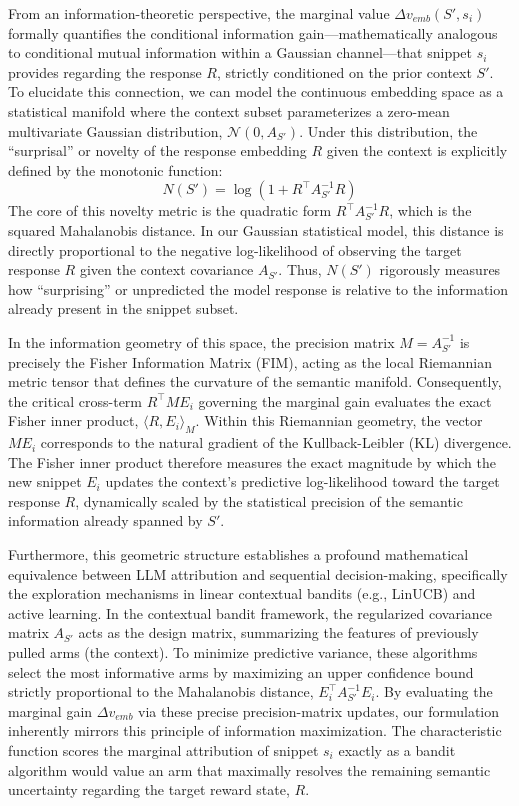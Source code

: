 \documentclass{article}
\begin{document}
From an information-theoretic perspective, the marginal value $\Delta v_{emb}(S', s_i)$ formally quantifies the conditional information gain—mathematically analogous to conditional mutual information within a Gaussian channel—that snippet $s_i$ provides regarding the response $R$, strictly conditioned on the prior context $S'$. To elucidate this connection, we can model the continuous embedding space as a statistical manifold where the context subset parameterizes a zero-mean multivariate Gaussian distribution, $\mathcal{N}(0, A_{S'})$. Under this distribution, the ``surprisal'' or novelty of the response embedding $R$ given the context is explicitly defined by the monotonic function:
$$ N(S') = \log(1 + R^\top A_{S'}^{-1} R) $$
The core of this novelty metric is the quadratic form $R^\top A_{S'}^{-1} R$, which is the squared Mahalanobis distance. In our Gaussian statistical model, this distance is directly proportional to the negative log-likelihood of observing the target response $R$ given the context covariance $A_{S'}$. Thus, $N(S')$ rigorously measures how ``surprising'' or unpredicted the model response is relative to the information already present in the snippet subset.

In the information geometry of this space, the precision matrix $M = A_{S'}^{-1}$ is precisely the Fisher Information Matrix (FIM), acting as the local Riemannian metric tensor that defines the curvature of the semantic manifold. Consequently, the critical cross-term $R^\top M E_i$ governing the marginal gain evaluates the exact Fisher inner product, $\langle R, E_i \rangle_M$. Within this Riemannian geometry, the vector $M E_i$ corresponds to the natural gradient of the Kullback-Leibler (KL) divergence. The Fisher inner product therefore measures the exact magnitude by which the new snippet $E_i$ updates the context's predictive log-likelihood toward the target response $R$, dynamically scaled by the statistical precision of the semantic information already spanned by $S'$.

Furthermore, this geometric structure establishes a profound mathematical equivalence between LLM attribution and sequential decision-making, specifically the exploration mechanisms in linear contextual bandits (e.g., LinUCB) and active learning. In the contextual bandit framework, the regularized covariance matrix $A_{S'}$ acts as the design matrix, summarizing the features of previously pulled arms (the context). To minimize predictive variance, these algorithms select the most informative arms by maximizing an upper confidence bound strictly proportional to the Mahalanobis distance, $E_i^\top A_{S'}^{-1} E_i$. By evaluating the marginal gain $\Delta v_{emb}$ via these precise precision-matrix updates, our formulation inherently mirrors this principle of information maximization. The characteristic function scores the marginal attribution of snippet $s_i$ exactly as a bandit algorithm would value an arm that maximally resolves the remaining semantic uncertainty regarding the target reward state, $R$.
\end{document}
